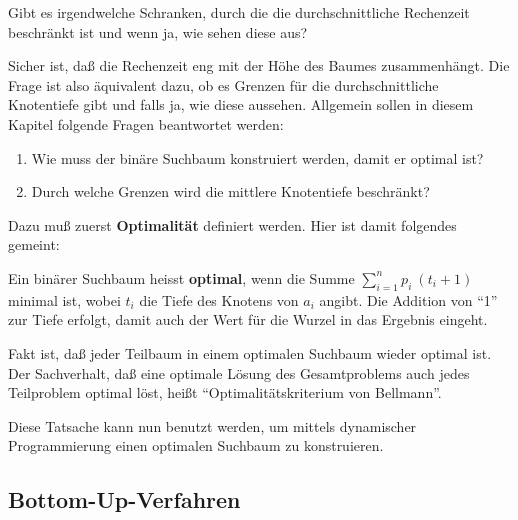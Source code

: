Gibt es irgendwelche Schranken, durch die die durchschnittliche
Rechenzeit beschränkt ist und wenn ja, wie sehen diese aus? 

Sicher ist, daß die Rechenzeit eng mit der Höhe des
Baumes zusammenhängt. Die Frage ist also äquivalent dazu, ob es Grenzen für die durchschnittliche Knotentiefe gibt und falls ja, wie 
diese aussehen.
Allgemein sollen in diesem Kapitel folgende Fragen beantwortet werden:
\begin{enumerate}
    \item Wie muss der binäre Suchbaum konstruiert werden, damit er optimal ist?
    \item Durch welche Grenzen wird die mittlere Knotentiefe beschränkt?
\end{enumerate}
\noindent
Dazu muß zuerst \textbf{Optimalität} definiert werden. Hier ist damit folgendes gemeint:
 \begin{definition}
   Ein binärer Suchbaum heisst \textbf{optimal}, wenn die Summe $\sum_{i=1}^n p_i\:(t_i+1)$ minimal ist, wobei
      $t_i$ die Tiefe des Knotens von $a_i$ angibt. Die Addition von "`1"' zur Tiefe erfolgt, damit auch der Wert für die Wurzel in
      das Ergebnis eingeht.
    \end{definition}
Fakt ist, daß jeder Teilbaum in einem optimalen Suchbaum wieder optimal ist. Der Sachverhalt, daß eine optimale Lösung des
Gesamtproblems auch jedes Teilproblem optimal löst, heißt "`Optimalitätskriterium von Bellmann"'.

Diese Tatsache kann nun benutzt werden, um mittels dynamischer Programmierung einen optimalen Suchbaum zu konstruieren.

\subsection{Bottom-Up-Verfahren}

